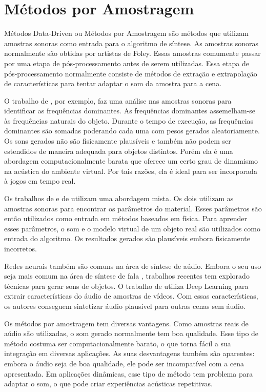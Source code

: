 \section{Métodos por Amostragem}
Métodos Data-Driven ou Métodos por Amostragem são métodos que utilizam amostras sonoras como entrada para o algoritmo de síntese. As amostras sonoras normalmente são obtidas por artistas de Foley. Essas amostras comumente passar por uma etapa de pós-processamento antes de serem utilizadas. Essa etapa de pós-processamento normalmente consiste de métodos de extração e extrapolação de características para tentar adaptar o som da amostra para a cena.

O trabalho de \cite{lloyd2011sound}, por exemplo, faz uma análise nas amostras sonoras para identificar as frequências dominantes. As frequências dominantes assemelham-se às frequências naturais do objeto. Durante o tempo de execução, as frequências dominantes são somadas poderando cada uma com pesos gerados aleatoriamente. Os sons gerados não são fisicamente plausíveis e também não podem ser estendidos de maneira adequada para objetos distintos. Porém ela é uma abordagem computacionalmente barata que oferece um certo grau de dinamismo na acústica do ambiente virtual. Por tais razões, ela é ideal para ser incorporada à jogos em tempo real.

Os trabalhos de \cite{ren2013example} e de \cite{sterling2016interactive} utilizam uma abordagem mista. Os dois utilizam as amostras sonoras para encontrar os parâmetros do material. Esses parâmetros são então utilizados como entrada em métodos baseados em física. Para aprender esses parâmetros, o som e o modelo virtual de um objeto real são utilizados como entrada do algoritmo. Os resultados gerados são plausíveis embora fisicamente incorretos. 

Redes neurais também são comuns na área de síntese de aúdio. Embora o seu uso seja mais comum na área de síntese de fala \cite{rahim1993use, ling2015deep}, trabalhos recentes tem explorado técnicas para gerar sons de objetos. O trabalho de \cite{visualIndicatedSounds} utiliza Deep Learning para extrair características do áudio de amostras de vídeos. Com essas características, os autores conseguem sintetizar áudio plausível para outras cenas sem áudio.

Os métodos por amostragem tem diversas vantagens. Como amostras reais de aúdio são utilizadas, o som gerado normalmente tem boa qualidade. Esse tipo de método costuma ser computacionalmente barato, o que torna fácil a sua integração em diversas aplicações. As suas desvantagens também são aparentes: embora o áudio seja de boa qualidade, ele pode ser incompatível com a cena apresentada. Em aplicações dinâmicas, esse tipo de método tem problema para adaptar o som, o que pode criar experiências acústicas repetitivas.

